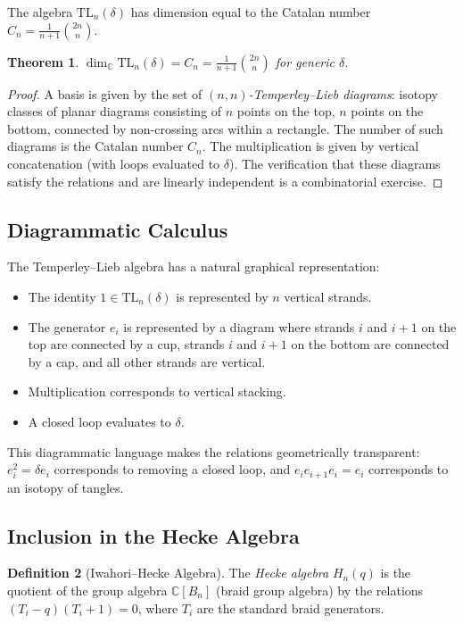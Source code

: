 \documentclass[12pt,a4paper]{amsart}
\newtheorem{theorem}{Theorem}[section]
\theoremstyle{definition}
\newtheorem{definition}[theorem]{Definition}
\theoremstyle{remark}
\begin{document}
The algebra $\mathrm{TL}_n(\delta)$ has dimension equal to the Catalan number
$C_n = \frac{1}{n+1}\binom{2n}{n}$.

\begin{theorem}
$\dim_\mathbb{C} \mathrm{TL}_n(\delta) = C_n = \frac{1}{n+1}\binom{2n}{n}$
for generic $\delta$.
\end{theorem}

\begin{proof}
A basis is given by the set of \emph{$(n,n)$-Temperley--Lieb diagrams}:
isotopy classes of planar diagrams consisting of $n$ points on the top,
$n$ points on the bottom, connected by non-crossing arcs within a rectangle.
The number of such diagrams is the Catalan number $C_n$. The multiplication
is given by vertical concatenation (with loops evaluated to $\delta$).
The verification that these diagrams satisfy the relations and are linearly
independent is a combinatorial exercise.
\end{proof}

\subsection{Diagrammatic Calculus}

The Temperley--Lieb algebra has a natural graphical representation:
\begin{itemize}
\item The identity $1 \in \mathrm{TL}_n(\delta)$ is represented by $n$
      vertical strands.
\item The generator $e_i$ is represented by a diagram where strands $i$
      and $i+1$ on the top are connected by a cup, strands $i$ and $i+1$
      on the bottom are connected by a cap, and all other strands are
      vertical.
\item Multiplication corresponds to vertical stacking.
\item A closed loop evaluates to $\delta$.
\end{itemize}

This diagrammatic language makes the relations geometrically transparent:
$e_i^2 = \delta e_i$ corresponds to removing a closed loop, and
$e_i e_{i+1} e_i = e_i$ corresponds to an isotopy of tangles.

\subsection{Inclusion in the Hecke Algebra}

\begin{definition}[Iwahori--Hecke Algebra]
The \emph{Hecke algebra} $H_n(q)$ is the quotient of the group algebra
$\mathbb{C}[B_n]$ (braid group algebra) by the relations
$(T_i - q)(T_i + 1) = 0$, where $T_i$ are the standard braid generators.
\end{definition}
\end{document}
